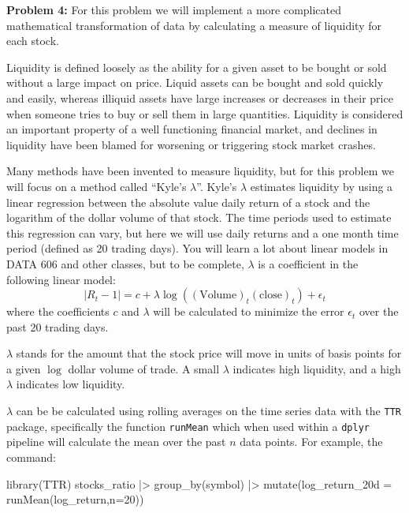\documentclass[
  letterpaper,
  DIV=11,
  numbers=noendperiod]{scrartcl}
\newenvironment{Shaded}{\begin{snugshade}}{\end{snugshade}}
\newcommand{\AttributeTok}[1]{\textcolor[rgb]{0.40,0.45,0.13}{#1}}
\newcommand{\DecValTok}[1]{\textcolor[rgb]{0.68,0.00,0.00}{#1}}
\newcommand{\FunctionTok}[1]{\textcolor[rgb]{0.28,0.35,0.67}{#1}}
\newcommand{\NormalTok}[1]{\textcolor[rgb]{0.00,0.23,0.31}{#1}}
\newcommand{\SpecialCharTok}[1]{\textcolor[rgb]{0.37,0.37,0.37}{#1}}
\begin{document}
\textbf{Problem 4:} For this problem we will implement a more
complicated mathematical transformation of data by calculating a measure
of liquidity for each stock.

Liquidity is defined loosely as the ability for a given asset to be
bought or sold without a large impact on price. Liquid assets can be
bought and sold quickly and easily, whereas illiquid assets have large
increases or decreases in their price when someone tries to buy or sell
them in large quantities. Liquidity is considered an important property
of a well functioning financial market, and declines in liquidity have
been blamed for worsening or triggering stock market crashes.

Many methods have been invented to measure liquidity, but for this
problem we will focus on a method called ``Kyle's \(\lambda\)''. Kyle's
\(\lambda\) estimates liquidity by using a linear regression between the
absolute value daily return of a stock and the logarithm of the dollar
volume of that stock. The time periods used to estimate this regression
can vary, but here we will use daily returns and a one month time period
(defined as 20 trading days). You will learn a lot about linear models
in DATA 606 and other classes, but to be complete, \(\lambda\) is a
coefficient in the following linear model: \[
|R_t-1| = c + \lambda \log((\mathrm{Volume})_t (\mathrm{close})_t) + \epsilon_t
\] where the coefficients \(c\) and \(\lambda\) will be calculated to
minimize the error \(\epsilon_t\) over the past 20 trading days.

\(\lambda\) stands for the amount that the stock price will move in
units of basis points for a given \(\log\) dollar volume of trade. A
small \(\lambda\) indicates high liquidity, and a high \(\lambda\)
indicates low liquidity.

\(\lambda\) can be be calculated using rolling averages on the time
series data with the \texttt{TTR} package, specifically the function
\texttt{runMean} which when used within a \texttt{dplyr} pipeline will
calculate the mean over the past \(n\) data points. For example, the
command:

\begin{Shaded}
\begin{Highlighting}[]
\FunctionTok{library}\NormalTok{(TTR)}
\NormalTok{stocks\_ratio }\SpecialCharTok{|\textgreater{}} \FunctionTok{group\_by}\NormalTok{(symbol) }\SpecialCharTok{|\textgreater{}}  \FunctionTok{mutate}\NormalTok{(}\AttributeTok{log\_return\_20d =} \FunctionTok{runMean}\NormalTok{(log\_return,}\AttributeTok{n=}\DecValTok{20}\NormalTok{))}
\end{Highlighting}
\end{Shaded}
\end{document}
